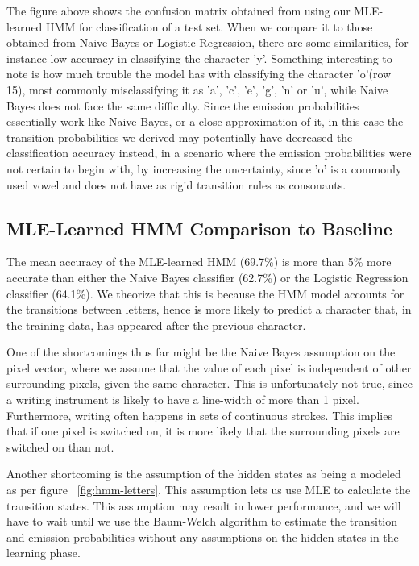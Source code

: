 \documentclass{article} %
\begin{document}
The figure above shows the confusion matrix obtained from using our MLE-learned HMM for classification of a test set. When we compare it to those obtained from Naive Bayes or Logistic Regression, there are some similarities, for instance low accuracy in classifying the character 'y'. Something interesting to note is how much trouble the model has with classifying the character 'o'(row 15), most commonly misclassifying it as 'a', 'c', 'e', 'g', 'n' or 'u', while Naive Bayes does not face the same difficulty. Since the emission probabilities essentially work like Naive Bayes, or a close approximation of it, in this case the transition probabilities we derived may potentially have decreased the classification accuracy instead, in a scenario where the emission probabilities were not certain to begin with, by increasing the uncertainty, since 'o' is a commonly used vowel and does not have as rigid transition rules as consonants.

\subsection{MLE-Learned HMM Comparison to Baseline}

The mean accuracy of the MLE-learned HMM (69.7\%) is more than 5\% more accurate than either the Naive Bayes classifier (62.7\%) or the Logistic Regression classifier (64.1\%). We theorize that this is because the HMM model accounts for the transitions between letters, hence is more likely to predict a character that, in the training data, has appeared after the previous character.

One of the shortcomings thus far might be the Naive Bayes assumption on the pixel vector, where we assume that the value of each pixel is independent of other surrounding pixels, given the same character. This is unfortunately not true, since a writing instrument is likely to have a line-width of more than 1 pixel. Furthermore, writing often happens in sets of continuous strokes. This implies that if one pixel is switched on, it is more likely that the surrounding pixels are switched on than not.

Another shortcoming is the assumption of the hidden states as being a modeled as per figure ~\ref{fig:hmm-letters}. This assumption lets us use MLE to calculate the transition states. This assumption may result in lower performance, and we will have to wait until we use the Baum-Welch algorithm to estimate the transition and emission probabilities without any assumptions on the hidden states in the learning phase.
\end{document}
